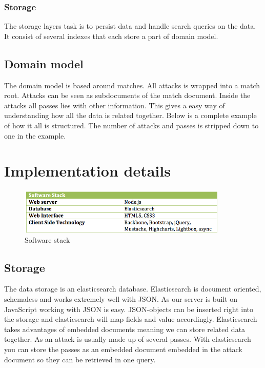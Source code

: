\subsubsection{Storage}

The storage layers task is to persist data and handle search queries on the data. It consist of several indexes that each store a part of domain model. 

\subsection{Domain model}

The domain model is based around matches. All attacks is wrapped into a match root. Attacks can be seen as subdocuments of the match document. Inside the attacks all passes lies with other information. This gives a easy way of understanding how all the data is related together. Below is a complete example of how it all is structured. The number of attacks and passes is stripped down to one in the example.



\section{Implementation details}

\begin{figure}[ht!]
\centering
\includegraphics[width=100mm]{images/implementation/software_stack.png}
\caption{Software stack}
\label{overflow}
\end{figure}

\subsection{Storage}

The data storage is an elasticsearch database\cite{elasticsearch:mainsite}. Elasticsearch is document oriented, schemaless and works extremely well with JSON. As our server is built on JavaScript working with JSON is easy. JSON-objects can be inserted right into the storage and elasticsearch will map fields and value accordingly. 
Elasticsearch takes advantages of embedded documents meaning we can store related data together. As an attack is usually made up of several passes. With elasticsearch you can store the passes as an embedded document embedded in the attack document so they can be retrieved in one query. 

